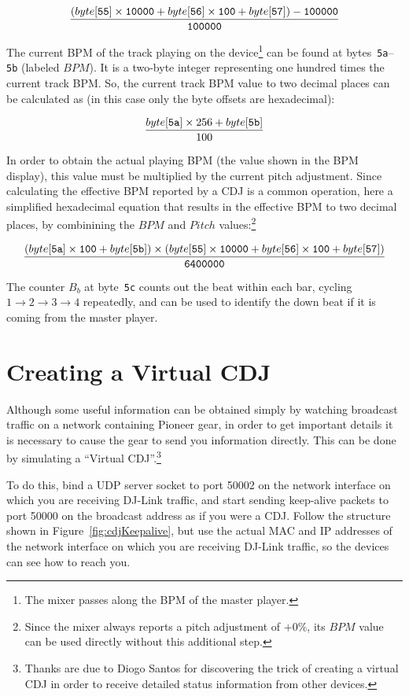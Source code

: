 \documentclass[11pt]{article}
\begin{document}
\begin{displaymath}
  \frac{(byte[{\tt 55}] \times {\tt 10000} + byte[{\tt 56}] \times
    {\tt 100} + byte[{\tt 57}]) - {\tt 100000}}{\tt 100000}
\end{displaymath}

The current BPM of the track playing on the device\footnote{The mixer
  passes along the BPM of the master player.} can be found at
bytes~{\tt 5a}--{\tt 5b} (labeled $BPM$). It is a two-byte integer
representing one hundred times the current track BPM. So, the current
track BPM value to two decimal places can be calculated as (in this
case only the byte offsets are hexadecimal):

\[ \frac{byte[{\tt 5a}] \times 256 + byte[{\tt 5b}]}{100} \]

In order to obtain the actual playing BPM (the value shown in the BPM
display), this value must be multiplied by the current pitch
adjustment. Since calculating the effective BPM reported by a CDJ is a
common operation, here a simplified hexadecimal equation that results
in the effective BPM to two decimal places, by combinining the $BPM$
and $Pitch$ values:\footnote{Since the mixer always reports a pitch
  adjustment of $+0\%$, its $BPM$ value can be used directly without
  this additional step.}

\[ \frac{(byte[{\tt 5a}] \times {\tt 100} + byte[{\tt 5b}]) \times
  (byte[{\tt 55}] \times {\tt 10000} + byte[{\tt 56}] \times {\tt 100}
  + byte[{\tt 57}])} {\tt 6400000} \]

The counter $B_b$ at byte~{\tt 5c} counts out the beat within each
bar, cycling $1\to2\to3\to4$ repeatedly, and can be used to identify
the down beat if it is coming from the master player.

\section{Creating a Virtual CDJ}
\label{sec:virtualCdj}

Although some useful information can be obtained simply by watching
broadcast traffic on a network containing Pioneer gear, in order to
get important details it is necessary to cause the gear to send you
information directly. This can be done by simulating a ``Virtual
CDJ''.\footnote{Thanks are due to Diogo Santos for discovering the
  trick of creating a virtual CDJ in order to receive detailed status
  information from other devices.}

To do this, bind a UDP server socket to port 50002 on the network
interface on which you are receiving DJ-Link traffic, and start
sending keep-alive packets to port 50000 on the broadcast address as
if you were a CDJ. Follow the structure shown in
Figure~\ref{fig:cdjKeepalive}, but use the actual MAC and IP addresses
of the network interface on which you are receiving DJ-Link traffic,
so the devices can see how to reach you.
\end{document}
